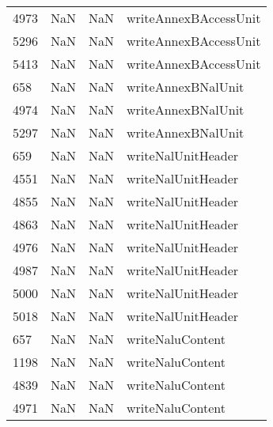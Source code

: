 \begin{tabular}{llll}
4973 &                   NaN &                        NaN &                     writeAnnexBAccessUnit \\
5296 &                   NaN &                        NaN &                     writeAnnexBAccessUnit \\
5413 &                   NaN &                        NaN &                     writeAnnexBAccessUnit \\
658  &                   NaN &                        NaN &                        writeAnnexBNalUnit \\
4974 &                   NaN &                        NaN &                        writeAnnexBNalUnit \\
5297 &                   NaN &                        NaN &                        writeAnnexBNalUnit \\
659  &                   NaN &                        NaN &                        writeNalUnitHeader \\
4551 &                   NaN &                        NaN &                        writeNalUnitHeader \\
4855 &                   NaN &                        NaN &                        writeNalUnitHeader \\
4863 &                   NaN &                        NaN &                        writeNalUnitHeader \\
4976 &                   NaN &                        NaN &                        writeNalUnitHeader \\
4987 &                   NaN &                        NaN &                        writeNalUnitHeader \\
5000 &                   NaN &                        NaN &                        writeNalUnitHeader \\
5018 &                   NaN &                        NaN &                        writeNalUnitHeader \\
657  &                   NaN &                        NaN &                          writeNaluContent \\
1198 &                   NaN &                        NaN &                          writeNaluContent \\
4839 &                   NaN &                        NaN &                          writeNaluContent \\
4971 &                   NaN &                        NaN &                          writeNaluContent \\

\end{tabular}
